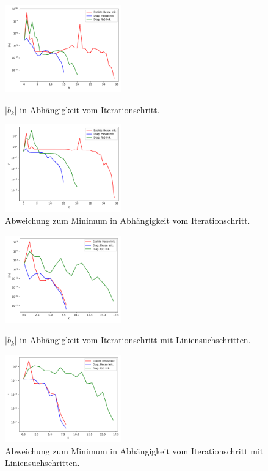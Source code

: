 \begin{figure}
\centering
\includegraphics[width=0.45\textwidth]{A2/build/A2.pdf}
\caption{$|b_k|$ in Abhängigkeit vom Iterationschritt.}
\label{fig:1}
\includegraphics[width=0.45\textwidth]{A2/build/A2r.pdf}
\caption{Abweichung zum Minimum in Abhängigkeit vom Iterationschritt.}
\label{fig:2}
\end{figure}
\begin{figure}
\centering
\includegraphics[width=0.45\textwidth]{A2/build/A2_l.pdf}
\caption{$|b_k|$ in Abhängigkeit vom Iterationschritt mit Liniensuchschritten.}
\label{fig:3}
\includegraphics[width=0.45\textwidth]{A2/build/A2_lr.pdf}
\caption{Abweichung zum Minimum in Abhängigkeit vom Iterationschritt mit Liniensuchschritten.}
\label{fig:4}
\end{figure}
